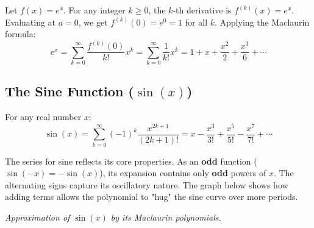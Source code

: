\begin{proofbox}
Let $f(x) = e^x$. For any integer $k \ge 0$, the $k$-th derivative is $f^{(k)}(x) = e^x$. Evaluating at $a=0$, we get $f^{(k)}(0) = e^0 = 1$ for all $k$. Applying the Maclaurin formula:
$$ e^x = \sum_{k=0}^{\infty} \frac{f^{(k)}(0)}{k!} x^k = \sum_{k=0}^{\infty} \frac{1}{k!} x^k = 1 + x + \frac{x^2}{2} + \frac{x^3}{6} + \cdots $$
\end{proofbox}


\subsection{The Sine Function ($\sin(x)$)}

\begin{theorembox}
For any real number $x$:
$$ \sin(x) = \sum_{k=0}^{\infty} (-1)^k \frac{x^{2k+1}}{(2k+1)!} = x - \frac{x^3}{3!} + \frac{x^5}{5!} - \frac{x^7}{7!} + \cdots $$
\end{theorembox}

\begin{intuitionbox}
The series for sine reflects its core properties. As an \textbf{odd} function ($ \sin(-x) = -\sin(x) $), its expansion contains only \textbf{odd} powers of $x$. The alternating signs capture its oscillatory nature. The graph below shows how adding terms allows the polynomial to "hug" the sine curve over more periods.

\tcblower

\centering
{}
\par\small\textit{Approximation of $\sin(x)$ by its Maclaurin polynomials.}
\end{intuitionbox}

